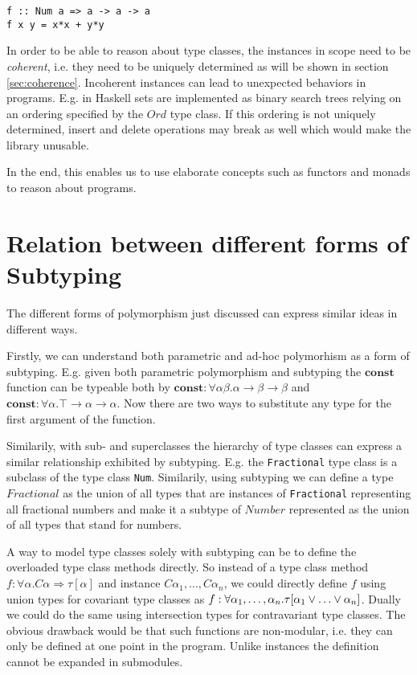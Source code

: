 \begin{verbatim}
f :: Num a => a -> a -> a
f x y = x*x + y*y
\end{verbatim}


In order to be able to reason about type classes, the instances in scope need to be \emph{coherent}, i.e. they need to be uniquely determined as will be shown in section \ref{sec:coherence}.
Incoherent instances can lead to unexpected behaviors in programs.
E.g. in Haskell sets are implemented as binary search trees relying on an ordering specified by the $Ord$ type class.
If this ordering is not uniquely determined, insert and delete operations may break as well which would make the library unusable. \cite{Kilpatrick2019-cy}

In the end, this enables us to use elaborate concepts such as functors and monads to reason about programs.


\section{Relation between different forms of Subtyping}\label{sec:relations}

The different forms of polymorphism just discussed can express similar ideas in different ways. 

Firstly, we can understand both parametric and ad-hoc polymorhism as a form of subtyping.
E.g. given both parametric polymorphism and subtyping the $\mathbf{const}$ function can be typeable both by
$\mathbf{const} : \forall \alpha \beta. \alpha \to \beta \to \beta$ and $\mathbf{const} : \forall \alpha. \top \to \alpha \to \alpha$.
Now there are two ways to substitute any type for the first argument of the function.

Similarily, with sub- and superclasses the hierarchy of type classes can express a similar relationship exhibited by subtyping.
E.g. the \texttt{Fractional} type class is a subclass of the type class \texttt{Num}.
Similarily, using subtyping we can define a type $\mathit{Fractional}$ as the union of all types that are instances of \texttt{Fractional} representing all fractional numbers and make it a subtype of $\mathit{Number}$ represented as the union of all types that stand for numbers.

A way to model type classes solely with subtyping can be to define the overloaded type class methods directly.
So instead of a type class method $f : \forall \alpha. C \alpha \Rightarrow \tau[\alpha]$ and instance $C \alpha_1, \dots, C \alpha_n$,
we could directly define $f$ using union types for covariant type classes as $f : \forall \alpha_1,\dots,\alpha_n. \tau[\alpha_1 \join \dots \join \alpha_n]$.
Dually we could do the same using intersection types for contravariant type classes.
The obvious drawback would be that such functions are non-modular, i.e. they can only be defined at one point in the program.
Unlike instances the definition cannot be expanded in submodules.

